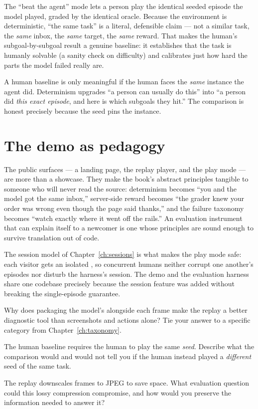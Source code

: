 \documentclass[11pt,openany]{book}
\newcommand{\code}[1]{\textcolor{clayd}{\texttt{\detokenize{#1}}}}
\newcommand{\exhead}{\vspace{0.8em}\needspace{3\baselineskip}%
  \noindent{\large\bfseries\color{clayd}Exercises}\par\nobreak\vspace{0.3em}}
\begin{document}
The ``beat the agent'' mode lets a person play the identical seeded episode the
model played, graded by the identical oracle. Because the environment is
deterministic, ``the same task'' is a literal, defensible claim — not a similar
task, the \emph{same} inbox, the \emph{same} target, the \emph{same} reward. That
makes the human's subgoal-by-subgoal result a genuine baseline: it establishes
that the task is humanly solvable (a sanity check on difficulty) and calibrates
just how hard the parts the model failed really are.

\begin{principle}[.\ ]
A human baseline is only meaningful if the human faces the \emph{same} instance
the agent did. Determinism upgrades ``a person can usually do this'' into ``a
person did \emph{this exact episode}, and here is which subgoals they hit.'' The
comparison is honest precisely because the seed pins the instance.
\end{principle}

\section{The demo as pedagogy}

The public surfaces — a landing page, the replay player, and the play mode — are
more than a showcase. They make the book's abstract principles tangible to someone
who will never read the source: determinism becomes ``you and the model got the
same inbox,'' server-side reward becomes ``the grader knew your order was wrong
even though the page said thanks,'' and the failure taxonomy becomes ``watch
exactly where it went off the rails.'' An evaluation instrument that can explain
itself to a newcomer is one whose principles are sound enough to survive
translation out of code.

\begin{notebox}[.\ ]
The session model of Chapter~\ref{ch:sessions} is what makes the play mode safe:
each visitor gets an isolated \code{sid}, so concurrent humans neither corrupt one
another's episodes nor disturb the harness's \code{default} session. The demo and
the evaluation harness share one codebase precisely because the session feature
was added without breaking the single-episode guarantee.
\end{notebox}

\exhead
\begin{exercises}
\item Why does packaging the model's \code{thought} alongside each frame make the
replay a better diagnostic tool than screenshots and actions alone? Tie your
answer to a specific category from Chapter~\ref{ch:taxonomy}.
\item The human baseline requires the human to play the same \emph{seed}. Describe
what the comparison would and would not tell you if the human instead played a
\emph{different} seed of the same task.
\item The replay downscales frames to JPEG to save space. What evaluation
question could this lossy compression compromise, and how would you preserve the
information needed to answer it?
\end{exercises}
\end{document}
